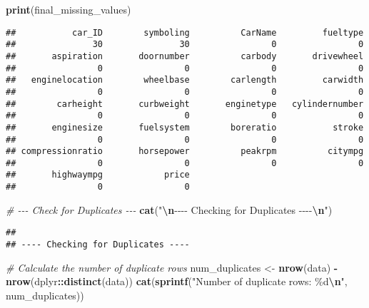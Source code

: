 \documentclass[
]{article}
\newenvironment{Shaded}{\begin{snugshade}}{\end{snugshade}}
\newcommand{\CommentTok}[1]{\textcolor[rgb]{0.56,0.35,0.01}{\textit{#1}}}
\newcommand{\FunctionTok}[1]{\textcolor[rgb]{0.13,0.29,0.53}{\textbf{#1}}}
\newcommand{\NormalTok}[1]{#1}
\newcommand{\OtherTok}[1]{\textcolor[rgb]{0.56,0.35,0.01}{#1}}
\newcommand{\SpecialCharTok}[1]{\textcolor[rgb]{0.81,0.36,0.00}{\textbf{#1}}}
\newcommand{\StringTok}[1]{\textcolor[rgb]{0.31,0.60,0.02}{#1}}
\begin{document}
\begin{Shaded}
\begin{Highlighting}[]
\FunctionTok{print}\NormalTok{(final\_missing\_values)}
\end{Highlighting}
\end{Shaded}

\begin{verbatim}
##           car_ID        symboling          CarName         fueltype 
##               30               30                0                0 
##       aspiration       doornumber          carbody       drivewheel 
##                0                0                0                0 
##   enginelocation        wheelbase        carlength         carwidth 
##                0                0                0                0 
##        carheight       curbweight       enginetype   cylindernumber 
##                0                0                0                0 
##       enginesize       fuelsystem        boreratio           stroke 
##                0                0                0                0 
## compressionratio       horsepower          peakrpm          citympg 
##                0                0                0                0 
##       highwaympg            price 
##                0                0
\end{verbatim}

\begin{Shaded}
\begin{Highlighting}[]
\CommentTok{\# {-}{-}{-} Check for Duplicates {-}{-}{-}}
\FunctionTok{cat}\NormalTok{(}\StringTok{"}\SpecialCharTok{\textbackslash{}n}\StringTok{{-}{-}{-}{-} Checking for Duplicates {-}{-}{-}{-}}\SpecialCharTok{\textbackslash{}n}\StringTok{"}\NormalTok{)}
\end{Highlighting}
\end{Shaded}

\begin{verbatim}
## 
## ---- Checking for Duplicates ----
\end{verbatim}

\begin{Shaded}
\begin{Highlighting}[]
\CommentTok{\# Calculate the number of duplicate rows}
\NormalTok{num\_duplicates }\OtherTok{\textless{}{-}} \FunctionTok{nrow}\NormalTok{(data) }\SpecialCharTok{{-}} \FunctionTok{nrow}\NormalTok{(dplyr}\SpecialCharTok{::}\FunctionTok{distinct}\NormalTok{(data))}
\FunctionTok{cat}\NormalTok{(}\FunctionTok{sprintf}\NormalTok{(}\StringTok{"Number of duplicate rows: \%d}\SpecialCharTok{\textbackslash{}n}\StringTok{"}\NormalTok{, num\_duplicates))}
\end{Highlighting}
\end{Shaded}
\end{document}
